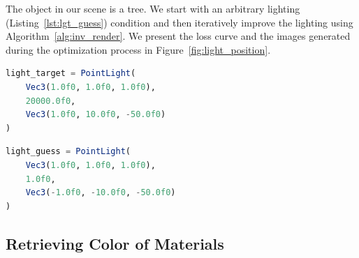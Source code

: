 \documentclass{juliacon}
\begin{document}
The object in our scene is a tree. We start with an arbitrary lighting (Listing~\ref{lst:lgt_guess}) condition and then iteratively improve the lighting using Algorithm~\ref{alg:inv_render}. We present the loss curve and the images generated during the optimization process in Figure~\ref{fig:light_position}.

\noindent
\begin{minipage}{\linewidth}
\begin{lstlisting}[caption = {Target Lighting Conditions},
                   label = {lst:lgt_target},
                   captionpos = b,
                   language = Julia]
light_target = PointLight(
    Vec3(1.0f0, 1.0f0, 1.0f0),
    20000.0f0,
    Vec3(1.0f0, 10.0f0, -50.0f0)
)
\end{lstlisting}
\end{minipage}

\noindent
\begin{minipage}{\linewidth}
\begin{lstlisting}[caption = {Initial Guess of Lighting Conditions},
                   label = {lst:lgt_guess},
                   captionpos = b,
                   language = Julia]
light_guess = PointLight(
    Vec3(1.0f0, 1.0f0, 1.0f0),
    1.0f0,
    Vec3(-1.0f0, -10.0f0, -50.0f0)
)
\end{lstlisting}
\end{minipage}

\subsection{Retrieving Color of Materials}
\label{sec:mat_color}
\end{document}
